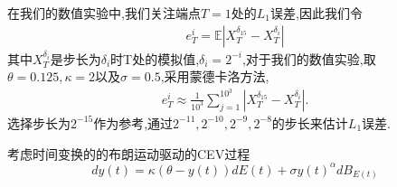 	在我们的数值实验中,我们关注端点$T = 1$处的$L_1$误差,因此我们令
	\begin{align*}
		e_T^{i}=\mathbb{E}\left|X_T^{\delta _{15}}-X_T^{\delta _i}\right|
	\end{align*}
	其中$X_T^{\delta _i}$是步长为$\delta _i$时T处的模拟值,$\delta _i = 2^{-i}$,对于我们的数值实验,取$\theta=0.125,\kappa=2$以及$\sigma=0.5$,采用蒙德卡洛方法,
	\begin{align*}
		e_{T}^i\approx\frac{1}{10^3}\sum_{j=1}^{10^3}\left|X_T^{\delta _{15}}-X_T^{\delta _i}\right|.
	\end{align*}
	选择步长为$2^{-15}$作为参考,通过${2^{-11},2^{-10},2^{-9},2^{-8}}$的步长来估计$L_1$误差.
	
	\begin{example}
		考虑时间变换的的布朗运动驱动的CEV过程
		\begin{equation}\label{CEV}
			dy(t)=\kappa(\theta-y(t))dE(t)+\sigma y(t)^\alpha dB_{E(t)}
		\end{equation}
	\end{example}
	

